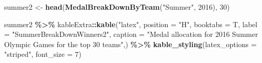 \documentclass[
]{article}
\newenvironment{Shaded}{\begin{snugshade}}{\end{snugshade}}
\newcommand{\AttributeTok}[1]{\textcolor[rgb]{0.13,0.29,0.53}{#1}}
\newcommand{\DecValTok}[1]{\textcolor[rgb]{0.00,0.00,0.81}{#1}}
\newcommand{\FunctionTok}[1]{\textcolor[rgb]{0.13,0.29,0.53}{\textbf{#1}}}
\newcommand{\NormalTok}[1]{#1}
\newcommand{\OtherTok}[1]{\textcolor[rgb]{0.56,0.35,0.01}{#1}}
\newcommand{\SpecialCharTok}[1]{\textcolor[rgb]{0.81,0.36,0.00}{\textbf{#1}}}
\newcommand{\StringTok}[1]{\textcolor[rgb]{0.31,0.60,0.02}{#1}}
\begin{document}
\newpage

\begin{Shaded}
\begin{Highlighting}[]
\NormalTok{summer2 }\OtherTok{\textless{}{-}} \FunctionTok{head}\NormalTok{(}\FunctionTok{MedalBreakDownByTeam}\NormalTok{(}\StringTok{"Summer"}\NormalTok{, }\DecValTok{2016}\NormalTok{), }\DecValTok{30}\NormalTok{)}

\NormalTok{summer2 }\SpecialCharTok{\%\textgreater{}\%} 
\NormalTok{  kableExtra}\SpecialCharTok{::}\FunctionTok{kable}\NormalTok{(}\StringTok{"latex"}\NormalTok{, }\AttributeTok{position =} \StringTok{"H"}\NormalTok{,  }\AttributeTok{booktabs =}\NormalTok{ T,}
         \AttributeTok{label =} \StringTok{"SummerBreakDownWinners2"}\NormalTok{,}
         \AttributeTok{caption =} \StringTok{"Medal allocation for 2016 Summer Olympic Games for the top 30 teams"}\NormalTok{,) }\SpecialCharTok{\%\textgreater{}\%} 
         \FunctionTok{kable\_styling}\NormalTok{(}\AttributeTok{latex\_options =} \StringTok{"striped"}\NormalTok{, }\AttributeTok{font\_size =} \DecValTok{7}\NormalTok{)}
\end{Highlighting}
\end{Shaded}
\end{document}

